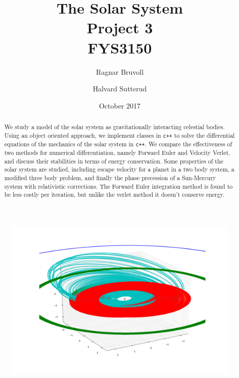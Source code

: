 \documentclass[10pt]{article}
\begin{document}
\title{The Solar System
\\ Project 3
\\ FYS3150}
\author{Ragnar Bruvoll \and Halvard Sutterud}
\date{October 2017}
\maketitle{\begin{center}\end{center}}
\thispagestyle{empty}

\begin{figure}[htpb]
    \centering
    \includegraphics[width=0.8\linewidth]{../results/front.png}
    \label{fig:name}
\end{figure}

\begin{abstract}
    We study a model of the solar system as gravitationally interacting
    celestial bodies.  Using an object oriented approach, we implement
    classes in \texttt{c++} to solve the differential equations of the
    mechanics of the solar system in \texttt{c++}. We compare the effectiveness of
    two methods for numerical differentiation, namely Forward Euler and
    Velocity Verlet, and discuss their stabilities in terms of energy
    conservation. Some properties of the solar system are studied, including
    escape velocity for a planet in a two body system, a modified three
    body problem, and finally the phase precession of a Sun-Mercury system
    with relativistic corrections. 
    The Forward Euler integration method is found to be less costly per
    iteration, but unlike the verlet method it doesn't conserve energy. 
\end{abstract}

\newpage
\end{document}

